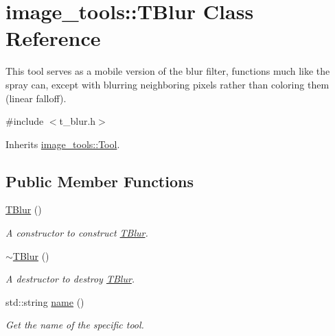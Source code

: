 \hypertarget{classimage__tools_1_1TBlur}{}\section{image\+\_\+tools\+:\+:T\+Blur Class Reference}
\label{classimage__tools_1_1TBlur}


This tool serves as a mobile version of the blur filter, functions much like the spray can, except with blurring neighboring pixels rather than coloring them (linear falloff).  




{\ttfamily \#include $<$t\+\_\+blur.\+h$>$}



Inherits \hyperlink{classimage__tools_1_1Tool}{image\+\_\+tools\+::\+Tool}.

\subsection*{Public Member Functions}
\begin{DoxyCompactItemize}
\item 
\hyperlink{classimage__tools_1_1TBlur_ada06c0361bde7e6c0458efa248fe63a1}{T\+Blur} ()\hypertarget{classimage__tools_1_1TBlur_ada06c0361bde7e6c0458efa248fe63a1}{}\label{classimage__tools_1_1TBlur_ada06c0361bde7e6c0458efa248fe63a1}

\begin{DoxyCompactList}\small\item\em A constructor to construct \hyperlink{classimage__tools_1_1TBlur}{T\+Blur}. \end{DoxyCompactList}\item 
\hyperlink{classimage__tools_1_1TBlur_a6ff50f8d2fc47f1b12bf22b4015fcda2}{$\sim$\+T\+Blur} ()\hypertarget{classimage__tools_1_1TBlur_a6ff50f8d2fc47f1b12bf22b4015fcda2}{}\label{classimage__tools_1_1TBlur_a6ff50f8d2fc47f1b12bf22b4015fcda2}

\begin{DoxyCompactList}\small\item\em A destructor to destroy \hyperlink{classimage__tools_1_1TBlur}{T\+Blur}. \end{DoxyCompactList}\item 
std\+::string \hyperlink{classimage__tools_1_1TBlur_a9277f8a68498ab7eb27977ae369d1c69}{name} ()
\begin{DoxyCompactList}\small\item\em Get the name of the specific tool. \end{DoxyCompactList}\end{DoxyCompactItemize}
